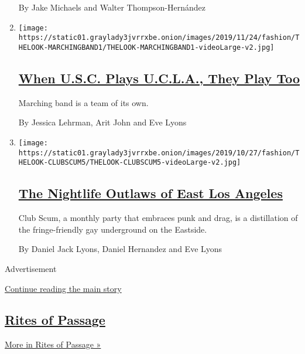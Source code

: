 \begin{enumerate}
  By Jake Michaels and Walter Thompson-Hernández
\item
  \texttt{[image: https://static01.graylady3jvrrxbe.onion/images/2019/11/24/fashion/THELOOK-MARCHINGBAND1/THELOOK-MARCHINGBAND1-videoLarge-v2.jpg]}

  \hypertarget{when-usc-plays-ucla-they-play-too}{%
  \subsection{\texorpdfstring{\href{/2019/11/23/style/usc-ucla-marching-band.html}{When
  U.S.C. Plays U.C.L.A., They Play
  Too}}{When U.S.C. Plays U.C.L.A., They Play Too}}\label{when-usc-plays-ucla-they-play-too}}

  Marching band is a team of its own.

  By Jessica Lehrman, Arit John and Eve Lyons
\item
  \texttt{[image: https://static01.graylady3jvrrxbe.onion/images/2019/10/27/fashion/THELOOK-CLUBSCUM5/THELOOK-CLUBSCUM5-videoLarge-v2.jpg]}

  \hypertarget{the-nightlife-outlaws-of-east-los-angeles}{%
  \subsection{\texorpdfstring{\href{/2019/10/19/style/the-nightlife-outlaws-of-east-los-angeles.html}{The
  Nightlife Outlaws of East Los
  Angeles}}{The Nightlife Outlaws of East Los Angeles}}\label{the-nightlife-outlaws-of-east-los-angeles}}

  Club Scum, a monthly party that embraces punk and drag, is a
  distillation of the fringe-friendly gay underground on the Eastside.

  By Daniel Jack Lyons, Daniel Hernandez and Eve Lyons
\end{enumerate}

Advertisement

\protect\hyperlink{after-mid6}{Continue reading the main story}

\hypertarget{rites-of-passage}{%
\subsection{\texorpdfstring{\href{/column/rites-of-passage}{Rites of
Passage}}{Rites of Passage}}\label{rites-of-passage}}

\href{/column/rites-of-passage}{More in Rites of Passage »}

